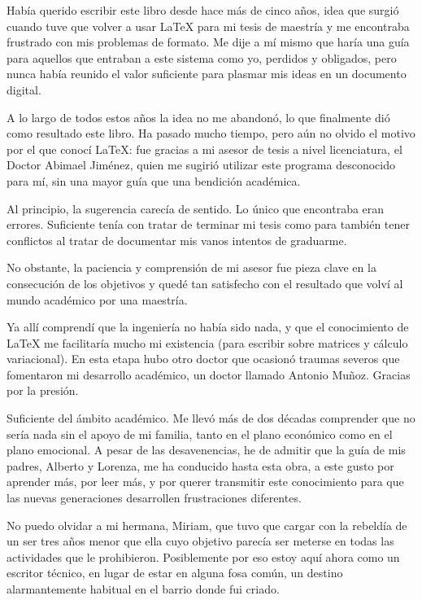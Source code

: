 \label{cha:agradecimientos}



Había querido escribir este libro desde hace más de cinco años, idea que surgió cuando tuve que volver a usar \LaTeX{} para mi tesis de maestría y me encontraba frustrado con mis problemas de formato. Me dije a mí mismo que haría una guía para aquellos que entraban a este sistema como yo, perdidos y obligados, pero nunca había reunido el valor suficiente para plasmar mis ideas en un documento digital.

A lo largo de todos estos años la idea no me abandonó, lo que finalmente dió como resultado este libro. Ha pasado mucho tiempo, pero aún no olvido el motivo por el que conocí \LaTeX{}: fue gracias a mi asesor de tesis a nivel licenciatura, el Doctor Abimael Jiménez, quien me sugirió utilizar este programa desconocido para mí, sin una mayor guía que una bendición académica.

Al principio, la sugerencia carecía de sentido. Lo único que encontraba eran errores. Suficiente tenía con tratar de terminar mi tesis como para también tener conflictos al tratar de documentar mis vanos intentos de graduarme.

No obstante, la paciencia y comprensión de mi asesor fue pieza clave en la consecución de los objetivos y quedé tan satisfecho con el resultado que volví al mundo académico por una maestría.

Ya allí comprendí que la ingeniería no había sido nada, y que el conocimiento de \LaTeX{} me facilitaría mucho mi existencia (para escribir sobre matrices y cálculo variacional). En esta etapa hubo otro doctor que ocasionó traumas severos que fomentaron mi desarrollo académico, un doctor llamado Antonio Muñoz. Gracias por la presión.

Suficiente del ámbito académico. Me llevó más de dos décadas comprender que no sería nada sin el apoyo de mi familia, tanto en el plano económico como en el plano emocional. A pesar de las desavenencias, he de admitir que la guía de mis padres, Alberto y Lorenza, me ha conducido hasta esta obra, a este gusto por aprender más, por leer más, y por querer transmitir este conocimiento para que las nuevas generaciones desarrollen frustraciones diferentes.

No puedo olvidar a mi hermana, Miriam, que tuvo que cargar con la rebeldía de un ser tres años menor que ella cuyo objetivo parecía ser meterse en todas las actividades que le prohibieron. Posiblemente por eso estoy aquí ahora como un escritor técnico, en lugar de estar en alguna fosa común, un destino alarmantemente habitual en el barrio donde fui criado.

